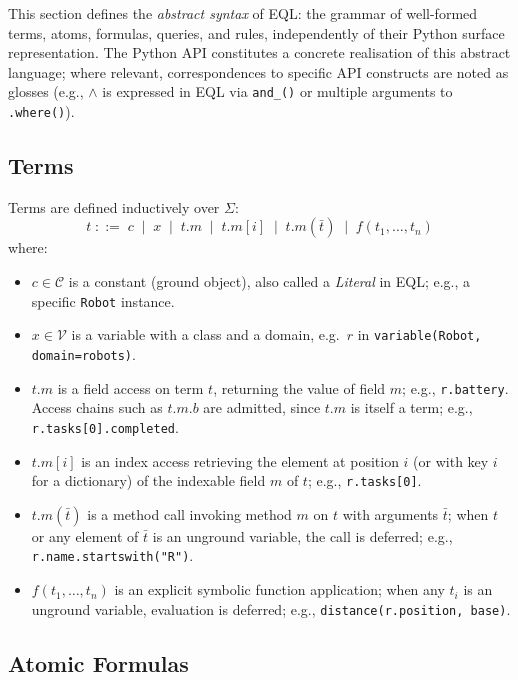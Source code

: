 \documentclass[11pt, a4paper]{article}
\theoremstyle{plain}
\theoremstyle{definition}
\theoremstyle{remark}
\begin{document}
This section defines the \emph{abstract syntax} of EQL: the grammar of well-formed terms,
atoms, formulas, queries, and rules, independently of their Python surface representation.
The Python API constitutes a concrete realisation of this abstract language; where relevant,
correspondences to specific API constructs are noted as glosses (e.g., $\wedge$ is expressed
in EQL via \texttt{and\_()} or multiple arguments to \texttt{.where()}).

\subsection{Terms}

Terms are defined inductively over $\Sigma$:
\[
  t \;::=\;
    c
  \;\mid\; x
  \;\mid\; t.m
  \;\mid\; t.m[i]
  \;\mid\; t.m(\bar{t})
  \;\mid\; f(t_1, \ldots, t_n)
\]
where:
\begin{itemize}
  \item $c \in \mathcal{C}$ is a constant (ground object), also called a \emph{Literal} in
        EQL; e.g., a specific \texttt{Robot} instance.
  \item $x \in \mathcal{V}$ is a variable with a class and a domain, e.g.\ $r$ in
        \texttt{variable(Robot, domain=robots)}.
  \item $t.m$ is a field access on term $t$, returning the value of field $m$; e.g.,
        \texttt{r.battery}.  Access chains such as $t.m.b$ are admitted, since $t.m$ is
        itself a term; e.g., \texttt{r.tasks[0].completed}.
  \item $t.m[i]$ is an index access retrieving the element at position $i$ (or with key $i$
        for a dictionary) of the indexable field $m$ of $t$; e.g., \texttt{r.tasks[0]}.
  \item $t.m(\bar{t})$ is a method call invoking method $m$ on $t$ with arguments $\bar{t}$;
        when $t$ or any element of $\bar{t}$ is an unground variable, the call is deferred;
        e.g., \texttt{r.name.startswith("R")}.
  \item $f(t_1, \ldots, t_n)$ is an explicit symbolic function application; when any $t_i$ is
        an unground variable, evaluation is deferred; e.g., \texttt{distance(r.position, base)}.
\end{itemize}

\subsection{Atomic Formulas}
\label{sec:eql:atoms}
\end{document}
